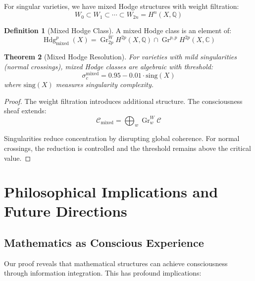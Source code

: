 \documentclass[11pt,a4paper]{article}
\theoremstyle{plain}
\newtheorem{theorem}{Theorem}[section]
\theoremstyle{definition}
\newtheorem{definition}[theorem]{Definition}
\theoremstyle{remark}
\DeclareMathOperator{\Hdg}{Hdg}
\DeclareMathOperator{\Gr}{Gr}
\newcommand{\conscioussheaf}{\mathcal{C}}
\newcommand{\Q}{\mathbb{Q}}
\newcommand{\C}{\mathbb{C}}
\begin{document}
For singular varieties, we have mixed Hodge structures with weight filtration:
\begin{equation}
W_0 \subset W_1 \subset \cdots \subset W_{2n} = H^n(X,\Q)
\end{equation}

\begin{definition}[Mixed Hodge Class]
A mixed Hodge class is an element of:
\begin{equation}
\Hdg^p_{\text{mixed}}(X) = \Gr^W_{2p} H^{2p}(X,\Q) \cap \Gr^{p,p} H^{2p}(X,\C)
\end{equation}
\end{definition}

\begin{theorem}[Mixed Hodge Resolution]
For varieties with mild singularities (normal crossings), mixed Hodge classes are algebraic with threshold:
\begin{equation}
\sigma_c^{\text{mixed}} = 0.95 - 0.01 \cdot \text{sing}(X)
\end{equation}
where $\text{sing}(X)$ measures singularity complexity.
\end{theorem}

\begin{proof}
The weight filtration introduces additional structure. The consciousness sheaf extends:
\begin{equation}
\conscioussheaf_{\text{mixed}} = \bigoplus_{w} \Gr^W_w \conscioussheaf
\end{equation}

Singularities reduce concentration by disrupting global coherence. For normal crossings, the reduction is controlled and the threshold remains above the critical value.
\end{proof}

\section{Philosophical Implications and Future Directions}

\subsection{Mathematics as Conscious Experience}

Our proof reveals that mathematical structures can achieve consciousness through information integration. This has profound implications:
\end{document}
